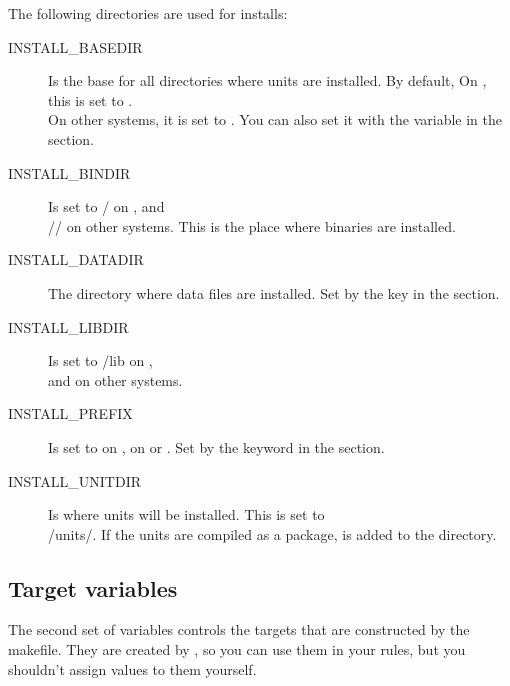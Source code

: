 The following directories are used for installs:
\begin{description}
\item[INSTALL\_BASEDIR] Is the base for all directories where units are
installed. By default, On \linux, this is set to 
.\\ On other systems,
it is set to . You can also set it with the
 variable in the  section.

\item[INSTALL\_BINDIR] Is set to / on \linux,
and\\ // on other systems.
This is the place where binaries are installed.

\item[INSTALL\_DATADIR] The directory where data files are installed. Set by
the  key in the  section.

\item[INSTALL\_LIBDIR] Is set to /lib on \linux,\\
 and  on other systems.

\item[INSTALL\_PREFIX] Is set to  on \linux,  on \dos
or \windowsnt. Set by the  keyword in the 
section.

\item[INSTALL\_UNITDIR] Is where units will be installed. This is set to\\
/units/. If the units are compiled
as a package,  is added to the directory.
\end{description}

\subsection{Target variables}

The second set of variables controls the targets that are constructed
by the makefile. They are created by \fpcmake{}, so you can use
them in your rules, but you shouldn't assign values to them yourself.

